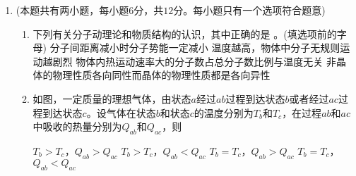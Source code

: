 \begin{enumerate}[leftmargin=0em]
\begin{enumerate}
\begin{enumerate}
\end{enumerate}
\begin{figure}[h!]
\flushright

\end{figure}






\end{enumerate}


\newpage
\item 
{}
(本题共有两小题，每小题$ 6 $分，共$ 12 $分。每小题只有一个选项符合题意)
\begin{enumerate}
\renewcommand{\labelenumii}{(\arabic{enumii})}

\item 
下列有关分子动理论和物质结构的认识，其中正确的是  
 。(填选项前的字母)
\fourchoices
{分子间距离减小时分子势能一定减小}
{温度越高，物体中分子无规则运动越剧烈}
{物体内热运动速率大的分子数占总分子数比例与温度无关}
{非晶体的物理性质各向同性而晶体的物理性质都是各向异性}



\item 
如图，一定质量的理想气体，由状态$ a $经过$ ab $过程到达状态$ b $或者经过$ ac $过程到达状态$ c $。设气体在状态$ b $和状态$ c $的温度分别为$ T_b $和$ T_c $，在过程$ ab $和$ ac $中吸收的热量分别为$ Q_{ab} $和$ Q_{ac} $，则  
\begin{figure}[h!]
\centering

\end{figure}

\fourchoices
{$ T_b >T_c $，$ Q_{ab}>Q_{ac} $}
{$ T_b >T_c $，$ Q_{ab}<Q_{ac} $}
{$ T_b =T_c $，$ Q_{ab}>Q_{ac} $}
{$ T_b =T_c $，$ Q_{ab}<Q_{ac} $}

\end{enumerate}	


\end{enumerate}
